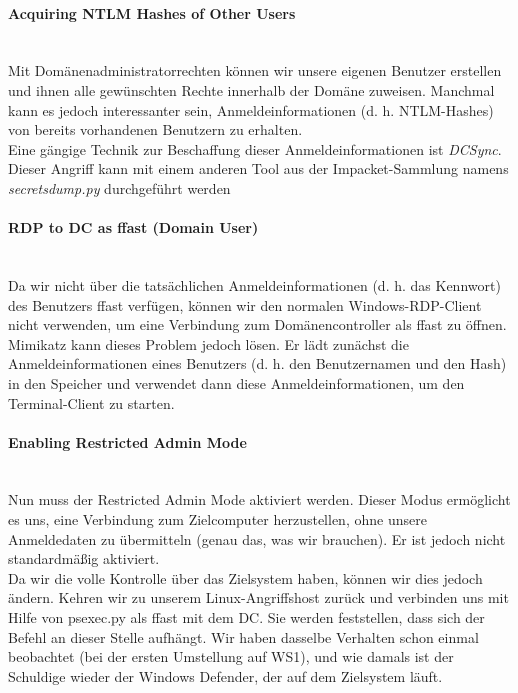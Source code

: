 \paragraph{Acquiring NTLM Hashes of Other Users}\mbox{} \\
Mit Domänenadministratorrechten können wir unsere eigenen Benutzer erstellen und ihnen alle gewünschten Rechte innerhalb der Domäne zuweisen. Manchmal kann es jedoch interessanter sein, Anmeldeinformationen (d. h. NTLM-Hashes) von bereits vorhandenen Benutzern zu erhalten.\\

Eine gängige Technik zur Beschaffung dieser Anmeldeinformationen ist \textcolor{OSTPink}{\textit{DCSync}}.\\
Dieser Angriff kann mit einem anderen Tool aus der Impacket-Sammlung namens \textcolor{OSTPink}{\textit{secretsdump.py}} durchgeführt werden

\paragraph{RDP to DC as ffast (Domain User)}\mbox{} \\
Da wir nicht über die tatsächlichen Anmeldeinformationen (d. h. das Kennwort) des Benutzers ffast verfügen, können wir den normalen Windows-RDP-Client nicht verwenden, um eine Verbindung zum Domänencontroller als ffast zu öffnen.\\

Mimikatz kann dieses Problem jedoch lösen. Er lädt zunächst die Anmeldeinformationen eines Benutzers (d. h. den Benutzernamen und den Hash) in den Speicher und verwendet dann diese Anmeldeinformationen, um den Terminal-Client zu starten.

\paragraph{Enabling Restricted Admin Mode}\mbox{} \\
Nun muss der Restricted Admin Mode aktiviert werden. Dieser Modus ermöglicht es uns, eine Verbindung zum Zielcomputer herzustellen, ohne unsere Anmeldedaten zu übermitteln (genau das, was wir brauchen). Er ist jedoch nicht standardmäßig aktiviert.\\
Da wir die volle Kontrolle über das Zielsystem haben, können wir dies jedoch ändern. Kehren wir zu unserem Linux-Angriffshost zurück und verbinden uns mit Hilfe von psexec.py als ffast mit dem DC.
Sie werden feststellen, dass sich der Befehl an dieser Stelle aufhängt. Wir haben dasselbe Verhalten schon einmal beobachtet (bei der ersten Umstellung auf WS1), und wie damals ist der Schuldige wieder der Windows Defender, der auf dem Zielsystem läuft.\\

